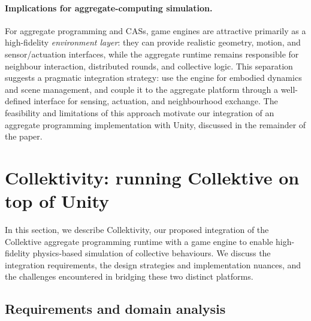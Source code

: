 \documentclass[runningheads]{llncs}
\begin{document}
\paragraph{Implications for aggregate-computing simulation.}

For aggregate programming and \acp{CAS}, game engines are attractive primarily as a
high-fidelity \emph{environment layer}: they can provide realistic geometry, motion,
and sensor/actuation interfaces, while the aggregate runtime remains responsible for neighbour
interaction, distributed rounds, and collective logic.
%
This separation suggests a pragmatic integration strategy: use the engine for embodied dynamics
and scene management, and couple it to the aggregate platform through a well-defined interface
for sensing, actuation, and neighbourhood exchange.
%
The feasibility and limitations of this approach motivate our integration of an aggregate
programming implementation with Unity, discussed in the remainder of the paper.

\section{Collektivity: running Collektive on top of Unity}\label{sec:integrating-collektive-with-unity}

In this section, we describe Collektivity,
our proposed integration of the Collektive aggregate programming runtime with a game engine
to enable high-fidelity physics-based simulation of collective behaviours.
%
We discuss the integration requirements,
the design strategies and implementation nuances,
and the challenges encountered in bridging these two distinct platforms.

\subsection{Requirements and domain analysis}\label{subsec:requirements}
\end{document}
